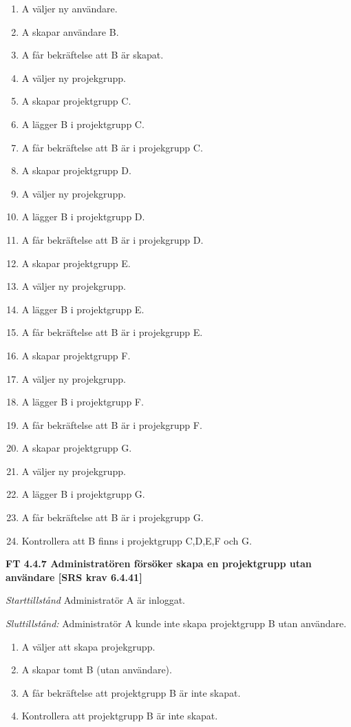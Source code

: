 \documentclass[a4paper]{article}
\begin{document}
\begin{enumerate}
\item A väljer ny användare.
\item A skapar användare B.
\item A får bekräftelse att B är skapat.
\item A väljer ny projekgrupp.
\item A skapar projektgrupp C.
\item A lägger B i projektgrupp C.
\item A får bekräftelse att B är i projekgrupp C.
\item A skapar projektgrupp D.
\item A väljer ny projekgrupp.
\item A lägger B i projektgrupp D.
\item A får bekräftelse att B är i projekgrupp D.
\item A skapar projektgrupp E.
\item A väljer ny projekgrupp.
\item A lägger B i projektgrupp E.
\item A får bekräftelse att B är i projekgrupp E.
\item A skapar projektgrupp F.
\item A väljer ny projekgrupp.
\item A lägger B i projektgrupp F.
\item A får bekräftelse att B är i projekgrupp F.
\item A skapar projektgrupp G.
\item A väljer ny projekgrupp.
\item A lägger B i projektgrupp G.
\item A får bekräftelse att B är i projekgrupp G.
\item Kontrollera att B finns i projektgrupp C,D,E,F och G.

\end{enumerate}

\textbf{FT 4.4.7 Administratören försöker skapa en projektgrupp utan användare [SRS krav 6.4.41]}

\emph{Starttillstånd} Administratör A är inloggat.

\emph{Sluttillstånd:} Administratör A kunde inte skapa  projektgrupp B utan användare.

\begin{enumerate}
\item A väljer att skapa projekgrupp.
\item A skapar tomt B (utan användare).
\item A får bekräftelse att projektgrupp B är inte skapat.
\item Kontrollera att projektgrupp B är inte skapat.
\end{enumerate}
\end{document}
